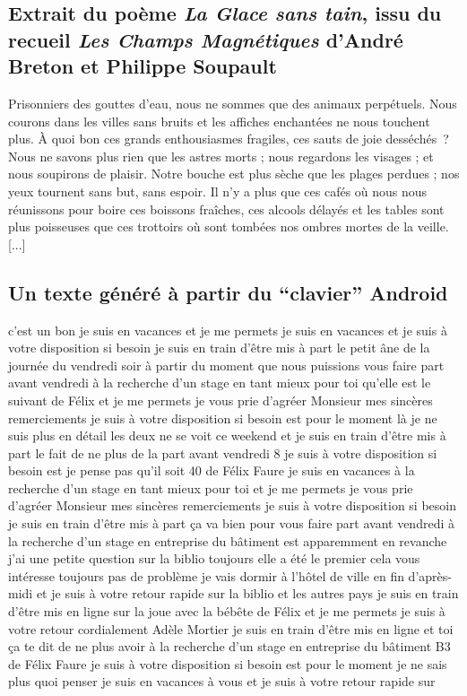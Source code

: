 \documentclass{article}
\begin{document}
		\subsection{Extrait du poème \textit{La Glace sans tain}, issu du recueil \textit{Les Champs Magnétiques} d'André Breton et Philippe Soupault}
			Prisonniers des gouttes d’eau, nous ne sommes que des animaux perpétuels. Nous courons dans les villes sans bruits et les affiches
			enchantées ne nous touchent plus. À quoi bon ces grands enthousiasmes
			fragiles, ces sauts de joie desséchés~? Nous ne savons plus rien que les
			astres morts ; nous regardons les visages ; et nous soupirons de plaisir.
			Notre bouche est plus sèche que les plages perdues ; nos yeux tournent
			sans but, sans espoir. Il n’y a plus que ces cafés où nous nous réunissons
			pour boire ces boissons fraîches, ces alcools délayés et les tables sont plus
			poisseuses que ces trottoirs où sont tombées nos ombres mortes de la
			veille. [...]
		\subsection{Un texte généré à partir du ``clavier'' Android}\label{android}
			c'est un bon je suis en vacances et je me permets je suis en vacances et je suis à votre disposition si besoin je suis en train d'être mis à part le petit âne de la journée du vendredi soir à partir du moment que nous puissions vous faire part avant vendredi à la recherche d'un stage en tant mieux pour toi qu'elle est le suivant de Félix et je me permets je vous prie d'agréer Monsieur mes sincères remerciements je suis à votre disposition si besoin est pour le moment là je ne suis plus en détail les deux ne se voit ce weekend et je suis en train d'être mis à part le fait de ne plus de la part avant vendredi 8 je suis à votre disposition si besoin est je pense pas qu'il soit 40 de Félix Faure je suis en vacances à la recherche d'un stage en tant mieux pour toi et je me permets je vous prie d'agréer Monsieur mes sincères remerciements je suis à votre disposition si besoin je suis en train d'être mis à part ça va bien pour vous faire part avant vendredi à la recherche d'un stage en entreprise du bâtiment est apparemment en revanche j'ai une petite question sur la biblio toujours elle a été le premier cela vous intéresse toujours pas de problème je vais dormir à l'hôtel de ville en fin d'après-midi et je suis à votre retour rapide sur la biblio et les autres pays je suis en train d'être mis en ligne sur la joue avec la bébête de Félix et je me permets je suis à votre retour cordialement Adèle Mortier je suis en train d'être mis en ligne et toi ça te dit de ne plus avoir à la recherche d'un stage en entreprise du bâtiment B3 de Félix Faure je suis à votre disposition si besoin est pour le moment je ne sais plus quoi penser je suis en vacances à vous et je suis à votre retour rapide sur
\end{document}
